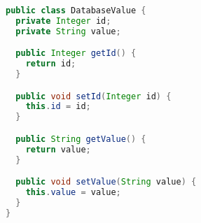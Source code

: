 
\begin{lstlisting}[language=Java, caption={Example of object loading from database}, label={code:model}]
public class DatabaseValue {
  private Integer id;
  private String value;

  public Integer getId() {
    return id;
  }

  public void setId(Integer id) {
    this.id = id;
  }

  public String getValue() {
    return value;
  }

  public void setValue(String value) {
    this.value = value;
  }
}
\end{lstlisting}
